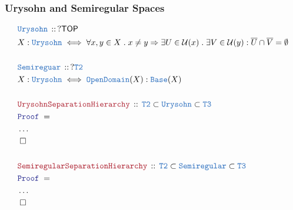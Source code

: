 \documentclass[12pt]{scrartcl}
\newcommand{\TYPE}[1]{\textcolor{NavyBlue}{\mathtt{#1}}}
\newcommand{\LOGIC}[1]{\textcolor{Blue}{\mathtt{#1}}}
\newcommand{\THM}[1]{\textcolor{Maroon}{\mathtt{#1}}}
\renewcommand{\.}{\; . \;}
\newcommand{\Theorem}[2]{& \THM{#1} \, :: \, #2 \\ & \Proof = \\ }
\newcommand{\DeclareType}[2]{& \TYPE{#1} \, :: \, #2 \\}
\newcommand{\DefineType}[3]{& #1 : \TYPE{#2} \iff #3 \\}
\newcommand{\Page}[1]{ \begin{align*} #1 \end{align*}   }
\newcommand{\NoProof}{ & \ldots \\ \EndProof}
\newcommand{\Imply}{\Rightarrow}
\newcommand{\QED}{\; \square}
\newcommand{\EndProof}{& \QED \\}
\newcommand{\Proof}{\LOGIC{Proof} \; }
\newcommand{\TOP}{\mathsf{TOP}}
\newcommand{\U}{\mathcal{U}}
\begin{document}
\subsubsection{Urysohn and Semiregular Spaces}
\Page{
	\DeclareType{Urysohn}{?\TOP}
	\DefineType{X}{Urysohn}
	{
		\forall x,y \in X \. 
		x \neq y \Imply 
		\exists U \in \U(x) \. 
		\exists V \in \U(y) :
		\overline{U} \cap \overline{V} = \emptyset
	}
	\\
	\DeclareType{Semireguar}{?\TYPE{T2}}
	\DefineType{X}{Urysohn}
	{
		\TYPE{OpenDomain}(X) : \TYPE{Base}(X)
	}
	\\
	\Theorem{UrysohnSeparationHierarchy}
	{
		\TYPE{T2} \subset \TYPE{Urysohn} \subset \TYPE{T3}
	}
	\NoProof
	\\
	\Theorem{SemiregularSeparationHierarchy}
	{
		\TYPE{T2} \subset \TYPE{Semiregular} \subset \TYPE{T3}
	}
	\NoProof
}
\newpage
\end{document}
